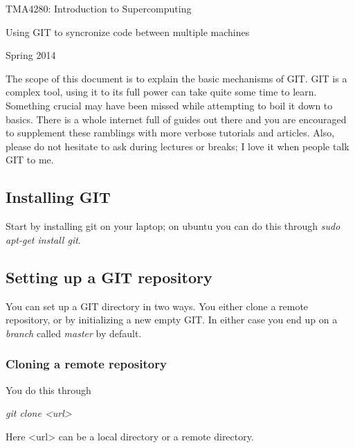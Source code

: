 \documentclass[twoside, 11pt, a4paper]{article}
\begin{document}
\LARGE
\begin{center}
TMA4280: Introduction to Supercomputing
\end{center}
\vspace{1in}

\begin{center}
{Using GIT to syncronize code between multiple machines}
\end{center}

\Large
\vspace{0.5in}
\begin{center}
Spring 2014
\end{center}

\vspace{0.5in}

\large

\newpage
The scope of this document is to explain the basic mechanisms of GIT.
GIT is a complex tool, using it to its full power can take quite some 
time to learn. Something crucial may have been missed while 
attempting to boil it down to basics. There is a whole internet full of guides
out there and you are encouraged to supplement these ramblings with more verbose
tutorials and articles. Also, please do not hesitate to ask during lectures
or breaks; I love it when people talk GIT to me.

\subsection*{Installing GIT}
Start by installing git on your laptop; on ubuntu you can do this through
\emph{sudo apt-get install git}.

\subsection*{Setting up a GIT repository}
You can set up a GIT directory in two ways. You either clone a remote
repository, or by initializing a new empty GIT.
In either case you end up on a \emph{branch} called \emph{master} by default.

\subsubsection*{Cloning a remote repository}
You do this through \\
\begin{center}\emph{git clone <url>}\end{center}
Here <url> can be a local directory or a remote directory.
\end{document}
